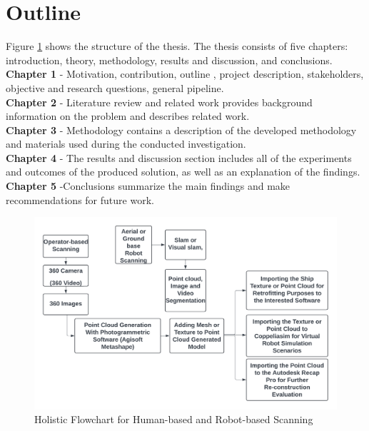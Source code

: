 \section{Outline}
Figure \ref{fig:Holistic View} shows the structure of the thesis. The thesis consists of five chapters:
introduction, theory, methodology,
results and discussion, and conclusions. \\

\noindent \textbf{Chapter 1} - Motivation, contribution, outline , project description, stakeholders, objective and research questions, general pipeline.\\

\noindent \textbf{Chapter 2} - Literature review and related work provides background
information on the problem and describes related work. \\

\noindent \textbf{Chapter 3} - Methodology contains a description of the developed methodology and materials used during the conducted investigation.\\ 

\noindent \textbf{Chapter 4} - The results and discussion section includes all of the experiments and outcomes of the produced solution, as well as an explanation of the findings.\\

\noindent \textbf{Chapter 5} -Conclusions summarize the main findings and make recommendations for future work.\\

\begin{figure}[H]
  \centering
  \includegraphics[width= 1.0\textwidth]{Figures/Whole View.png}
  \caption[Holistic View ]{Holistic Flowchart for Human-based and Robot-based Scanning}
  \label{fig:Holistic View}
\end{figure}

